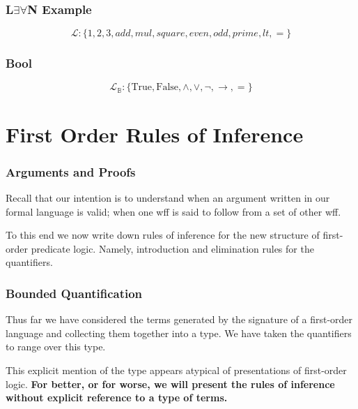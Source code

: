 \documentclass{beamer}
\theoremstyle{indentDefn} \newtheorem{defn}[]{Definition}
\begin{document}
\begin{frame}
	\frametitle{L$\exists\forall$N Example}
	
	$$\mathcal{L}: \{1,2,3,add,mul,square,even,odd,prime,lt,=\}$$
	
	\vspace{60mm}	
	
\end{frame}

\begin{frame}
	\frametitle{Bool}

	$$\mathcal{L}_{\mathbb{B}} : \{\text{True}, \text{False}, \land, \lor, \lnot, \to, =\}$$

	\vspace{65mm}

\end{frame}

\section{First Order Rules of Inference}

\begin{frame}
	\frametitle{Arguments and Proofs}
	
	Recall that our intention is to understand when an argument written in our formal language is valid; when one wff is said to follow from a set of other wff. 
  
	\vspace{2mm}
	
	To this end we now write down rules of inference for the new structure of first-order predicate logic. Namely, introduction and elimination rules for the quantifiers. 
	
\end{frame}

\begin{frame}
	\frametitle{Bounded Quantification}

	Thus far we have considered the terms generated by the signature of a first-order language and collecting them together into a type. We have taken the quantifiers to range over this type. 

	\vspace{3cm}

	This explicit mention of the type appears atypical of presentations of first-order logic. {\bf For better, or for worse, we will present the rules of inference without explicit reference to a type of terms.}

\end{frame}
\end{document}
